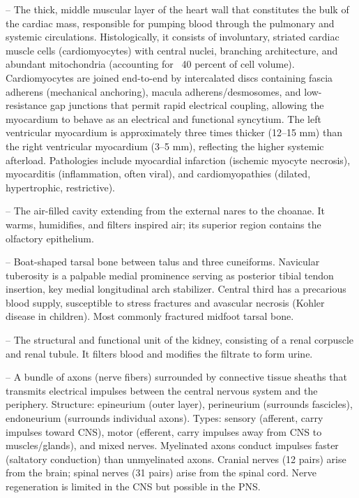 -- The thick, middle muscular layer of the heart wall that constitutes the bulk of the cardiac mass, responsible for pumping blood through the pulmonary and systemic circulations. Histologically, it consists of involuntary, striated cardiac muscle cells (cardiomyocytes) with central nuclei, branching architecture, and abundant mitochondria (accounting for ~40 percent of cell volume). Cardiomyocytes are joined end-to-end by intercalated discs containing fascia adherens (mechanical anchoring), macula adherens/desmosomes, and low-resistance gap junctions that permit rapid electrical coupling, allowing the myocardium to behave as an electrical and functional syncytium. The left ventricular myocardium is approximately three times thicker (12--15 mm) than the right ventricular myocardium (3--5 mm), reflecting the higher systemic afterload. Pathologies include myocardial infarction (ischemic myocyte necrosis), myocarditis (inflammation, often viral), and cardiomyopathies (dilated, hypertrophic, restrictive).

-- The air-filled cavity extending from the external nares to the choanae. It warms, humidifies, and filters inspired air; its superior region contains the olfactory epithelium.

-- Boat-shaped tarsal bone between talus and three cuneiforms. Navicular tuberosity is a palpable medial prominence serving as posterior tibial tendon insertion, key medial longitudinal arch stabilizer. Central third has a precarious blood supply, susceptible to stress fractures and avascular necrosis (Kohler disease in children). Most commonly fractured midfoot tarsal bone.

-- The structural and functional unit of the kidney, consisting of a renal corpuscle and renal tubule. It filters blood and modifies the filtrate to form urine.

-- A bundle of axons (nerve fibers) surrounded by connective tissue sheaths that transmits electrical impulses between the central nervous system and the periphery. Structure: epineurium (outer layer), perineurium (surrounds fascicles), endoneurium (surrounds individual axons). Types: sensory (afferent, carry impulses toward CNS), motor (efferent, carry impulses away from CNS to muscles/glands), and mixed nerves. Myelinated axons conduct impulses faster (saltatory conduction) than unmyelinated axons. Cranial nerves (12 pairs) arise from the brain; spinal nerves (31 pairs) arise from the spinal cord. Nerve regeneration is limited in the CNS but possible in the PNS.

